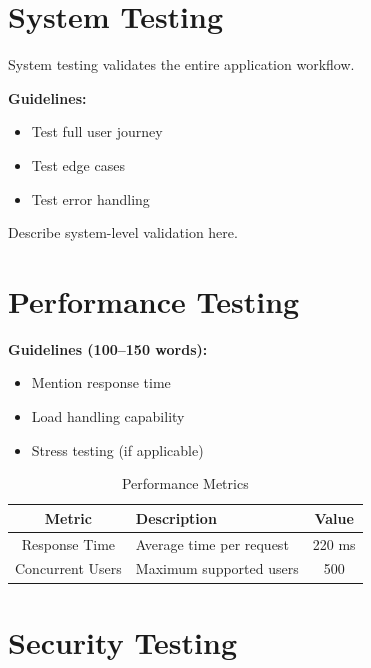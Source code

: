 
\section{System Testing}

System testing validates the entire application workflow.

\textbf{Guidelines:}
\begin{itemize}
    \item Test full user journey
    \item Test edge cases
    \item Test error handling
\end{itemize}

Describe system-level validation here.


\section{Performance Testing}

\textbf{Guidelines (100–150 words):}
\begin{itemize}
    \item Mention response time
    \item Load handling capability
    \item Stress testing (if applicable)
\end{itemize}

\begin{table}[h]
\centering
\caption{Performance Metrics}
\begin{tabularx}{\textwidth}{|c|X|c|}
\hline
\textbf{Metric} & \textbf{Description} & \textbf{Value} \\
\hline
Response Time & Average time per request & 220 ms \\
\hline
Concurrent Users & Maximum supported users & 500 \\
\hline
\end{tabularx}
\end{table}


\section{Security Testing}

